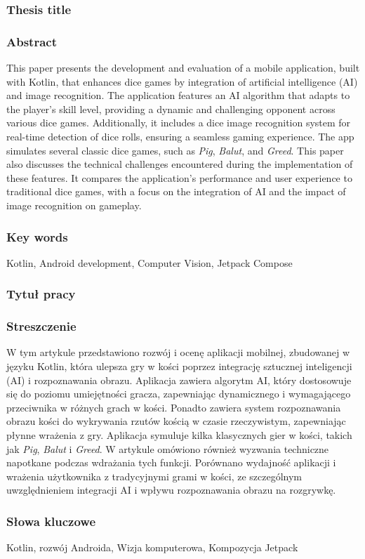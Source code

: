 \subsubsection*{Thesis title}  
\Title

\subsubsection*{Abstract}  
This paper presents the development and evaluation of a mobile application, built with Kotlin, that enhances dice games by integration of artificial intelligence (AI) and image recognition. The application features an AI algorithm that adapts to the player's skill level, providing a dynamic and challenging opponent across various dice games. Additionally, it includes a dice image recognition system for real-time detection of dice rolls, ensuring a seamless gaming experience. The app simulates several classic dice games, such as \emph{Pig}, \emph{Balut}, and \emph{Greed}. This paper also discusses the technical challenges encountered during the implementation of these features. It compares the application's performance and user experience to traditional dice games, with a focus on the integration of AI and the impact of image recognition on gameplay.

\subsubsection*{Key words}  
Kotlin, Android development, Computer Vision, Jetpack Compose

\subsubsection*{Tytuł pracy}
\begin{otherlanguage}{polish}
\TitleAlt
\end{otherlanguage}

\subsubsection*{Streszczenie} 
\begin{otherlanguage}{polish}       
W tym artykule przedstawiono rozwój i ocenę aplikacji mobilnej, zbudowanej w języku Kotlin, która ulepsza gry w kości poprzez integrację sztucznej inteligencji (AI) i rozpoznawania obrazu. Aplikacja zawiera algorytm AI, który dostosowuje się do poziomu umiejętności gracza, zapewniając dynamicznego i wymagającego przeciwnika w różnych grach w kości. Ponadto zawiera system rozpoznawania obrazu kości do wykrywania rzutów kością w czasie rzeczywistym, zapewniając płynne wrażenia z gry. Aplikacja symuluje kilka klasycznych gier w kości, takich jak \emph{Pig}, \emph{Balut} i \emph{Greed}. W artykule omówiono również wyzwania techniczne napotkane podczas wdrażania tych funkcji. Porównano wydajność aplikacji i wrażenia użytkownika z tradycyjnymi grami w kości, ze szczególnym uwzględnieniem integracji AI i wpływu rozpoznawania obrazu na rozgrywkę.

\end{otherlanguage}

\subsubsection*{Słowa kluczowe} 
\begin{otherlanguage}{polish}
Kotlin, rozwój Androida, Wizja komputerowa, Kompozycja Jetpack
\end{otherlanguage}

